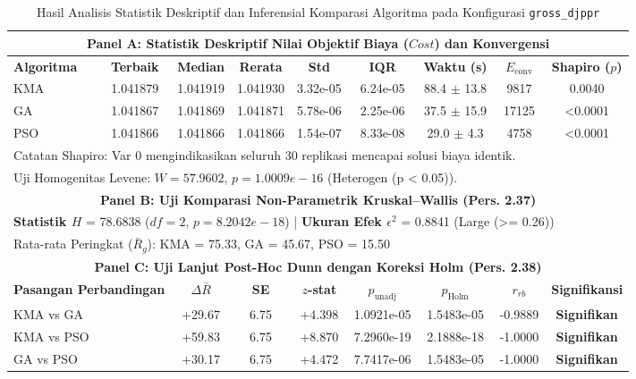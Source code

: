 \begin{table}[htbp]
\centering
\caption{Hasil Analisis Statistik Deskriptif dan Inferensial Komparasi Algoritma pada Konfigurasi \texttt{gross_djppr}}
\label{tab:stats_gross_djppr}
\small
\begin{tabular}{lcccccccc}
\toprule
\multicolumn{9}{c}{\textbf{Panel A: Statistik Deskriptif Nilai Objektif Biaya ($Cost$) dan Konvergensi}} \\
\midrule
\textbf{Algoritma} & \textbf{Terbaik} & \textbf{Median} & \textbf{Rerata} & \textbf{Std} & \textbf{IQR} & \textbf{Waktu (s)} & \textbf{$E_{\text{conv}}$} & \textbf{Shapiro ($p$)} \\
\midrule
KMA & 1.041879 & 1.041919 & 1.041930 & 3.32e-05 & 6.24e-05 & 88.4 $\pm$ 13.8 & 9817 & 0.0040 \\
GA & 1.041867 & 1.041869 & 1.041871 & 5.78e-06 & 2.25e-06 & 37.5 $\pm$ 15.9 & 17125 & <0.0001 \\
PSO & 1.041866 & 1.041866 & 1.041866 & 1.54e-07 & 8.33e-08 & 29.0 $\pm$ 4.3 & 4758 & <0.0001 \\
\midrule
\multicolumn{9}{l}{\footnotesize *Catatan Shapiro: Var 0 mengindikasikan seluruh 30 replikasi mencapai solusi biaya identik.} \\
\multicolumn{9}{l}{\footnotesize Uji Homogenitas Levene: $W = 57.9602$, $p = 1.0009e-16$ (Heterogen (p < 0.05)).} \\
\midrule
\multicolumn{9}{c}{\textbf{Panel B: Uji Komparasi Non-Parametrik Kruskal--Wallis (Pers. 2.37)}} \\
\midrule
\multicolumn{9}{l}{\textbf{Statistik $H$} = 78.6838 \quad ($df = 2$, $p = 8.2042e-18$) \quad | \quad \textbf{Ukuran Efek $\epsilon^2$} = 0.8841 (Large (>= 0.26))} \\
\multicolumn{9}{l}{\footnotesize Rata-rata Peringkat ($\bar{R}_g$): KMA = 75.33, GA = 45.67, PSO = 15.50} \\
\midrule
\multicolumn{9}{c}{\textbf{Panel C: Uji Lanjut Post-Hoc Dunn dengan Koreksi Holm (Pers. 2.38)}} \\
\midrule
\multicolumn{2}{l}{\textbf{Pasangan Perbandingan}} & \textbf{$\Delta \bar{R}$} & \textbf{SE} & \textbf{$z$-stat} & \textbf{$p_{\text{unadj}}$} & \textbf{$p_{\text{Holm}}$} & \textbf{$r_{rb}$} & \textbf{Signifikansi} \\
\midrule
\multicolumn{2}{l}{KMA vs GA} & +29.67 & 6.75 & +4.398 & 1.0921e-05 & 1.5483e-05 & -0.9889 & \textbf{Signifikan} \\
\multicolumn{2}{l}{KMA vs PSO} & +59.83 & 6.75 & +8.870 & 7.2960e-19 & 2.1888e-18 & -1.0000 & \textbf{Signifikan} \\
\multicolumn{2}{l}{GA vs PSO} & +30.17 & 6.75 & +4.472 & 7.7417e-06 & 1.5483e-05 & -1.0000 & \textbf{Signifikan} \\
\bottomrule
\end{tabular}
\end{table}